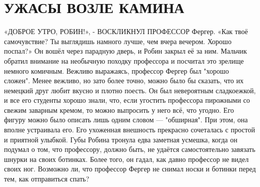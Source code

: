 \documentclass[a4paper,12pt]{book}
\begin{document}
\chapter{УЖАСЫ ВОЗЛЕ КАМИНА}
	«ДОБРОЕ УТРО, РОБИН!», - ВОСКЛИКНУЛ ПРОФЕССОР Фергер.
	«Как твоё самочувствие? Ты выглядишь намного лучше, чем вчера вечером. Хорошо поспал?»
	Он вошёл через парадную дверь, и Робин закрыл её за ним. Мальчик обратил внимание на необычную походку профессора и посчитал это зрелище немного комичным. Вежливо выражаясь, профессор Фергер был "хорошо сложен". Менее вежливо, но зато более точно, можно было бы сказать, что их немецкий друг любит вкусно и плотно поесть. Он был невероятным сладкоежкой, и все его студенты хорошо знали, что, если угостить профессора пирожными со свежим заварным кремом, то можно выпросить у него всё, что угодно. Его фигуру можно было описать лишь одним словом — "обширная". При этом, она вполне устраивала его. Его ухоженная внешность прекрасно сочеталась с простой и приятной улыбкой. Губы Робина тронула едва заметная усмешка, когда он подумал о том, что профессору, должно быть, не удаётся самостоятельно завязать шнурки на своих ботинках. Более того, он гадал, как давно профессор не видел своих ног. Возможно ли, что профессор Фергер не снимал носки и ботинки перед тем, как отправиться спать?
\end{document}
